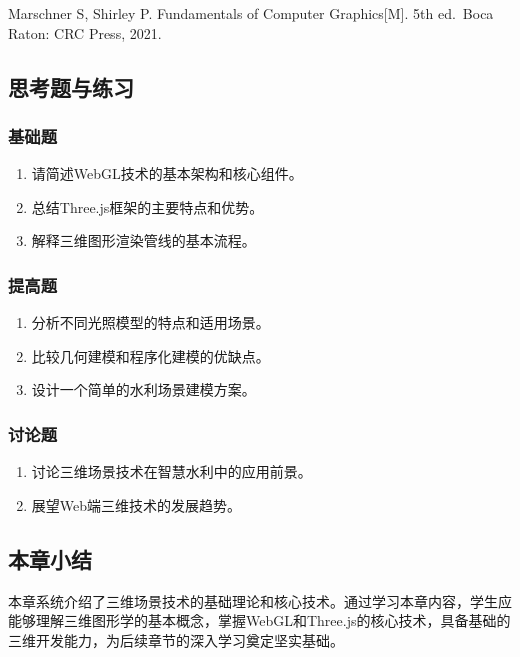 Marschner S, Shirley P. Fundamentals of Computer Graphics{[}M{]}. 5th ed.~Boca Raton: CRC Press, 2021. \subsection{思考题与练习}\label{ux601dux8003ux9898ux4e0eux7ec3ux4e60} \subsubsection{基础题}\label{ux57faux7840ux9898} \begin{enumerate} \def\labelenumi{\arabic{enumi}.} \item 请简述WebGL技术的基本架构和核心组件。 \item 总结Three.js框架的主要特点和优势。 \item 解释三维图形渲染管线的基本流程。 \end{enumerate} \subsubsection{提高题}\label{ux63d0ux9ad8ux9898} \begin{enumerate} \def\labelenumi{\arabic{enumi}.} \setcounter{enumi}{3} \item 分析不同光照模型的特点和适用场景。 \item 比较几何建模和程序化建模的优缺点。 \item 设计一个简单的水利场景建模方案。 \end{enumerate} \subsubsection{讨论题}\label{ux8ba8ux8bbaux9898} \begin{enumerate} \def\labelenumi{\arabic{enumi}.} \setcounter{enumi}{6} \item 讨论三维场景技术在智慧水利中的应用前景。 \item 展望Web端三维技术的发展趋势。 \end{enumerate} \subsection{本章小结}\label{ux672cux7ae0ux5c0fux7ed3} 本章系统介绍了三维场景技术的基础理论和核心技术。通过学习本章内容，学生应能够理解三维图形学的基本概念，掌握WebGL和Three.js的核心技术，具备基础的三维开发能力，为后续章节的深入学习奠定坚实基础。

